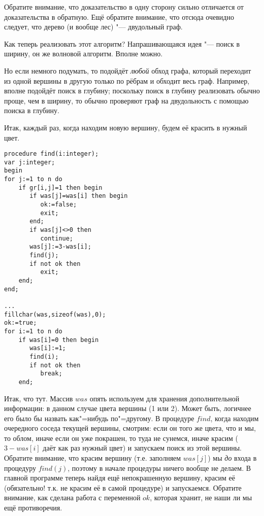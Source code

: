 Обратите внимание, что доказательство в одну сторону сильно отличается от доказательства в 
обратную. Ещё обратите внимание, что отсюда очевидно следует, что дерево (и вообще лес) "--- 
двудольный граф.

\vspace{0.2cm}


Как теперь реализовать этот алгоритм? Напрашивающаяся идея "--- поиск в ширину, он же волновой 
алгоритм. Вполне можно. 


Но если немного подумать, то подойдёт \textit{любой} обход  графа, который переходит из одной 
вершины в другую только по рёбрам и обходит весь граф. Например, вполне подойдёт поиск в глубину; 
поскольку поиск в глубину реализовать обычно проще, чем в ширину, то обычно проверяют граф на 
двудольность с помощью поиска в глубину.

Итак, каждый раз, когда находим новую вершину, будем её красить в нужный цвет.
\begin{codesample}
\begin{verbatim}
procedure find(i:integer);
var j:integer;
begin
for j:=1 to n do
    if gr[i,j]=1 then begin
       if was[j]=was[i] then begin
          ok:=false;
          exit;
       end;
       if was[j]<>0 then
          continue;
       was[j]:=3-was[i];
       find(j);
       if not ok then
          exit;
    end;
end;

...
fillchar(was,sizeof(was),0);
ok:=true;
for i:=1 to n do
    if was[i]=0 then begin
       was[i]:=1;
       find(i);
       if not ok then
          break;
    end;
\end{verbatim}
\end{codesample}

Итак, что тут. Массив $was$ опять используем для хранения дополнительной информации: в данном 
случае цвета вершины (1 или 2). Может быть, логичнее его было бы назвать как"=нибудь по"=другому.
В процедуре $find$, когда находим очередного соседа текущей вершины, смотрим: если он того же 
цвета, что и мы, то облом, иначе если он уже покрашен, то туда не сунемся, иначе красим ($3-was[i]$ 
даёт как раз нужный цвет) и запускаем поиск из этой вершины. Обратите внимание, что красим вершину 
(т.е. заполняем $was[j]$) мы \textit{до} входа в процедуру $find(j)$, поэтому в начале процедуры 
ничего вообще не делаем. В главной программе теперь найдя ещё непокрашенную вершину, красим её 
(обязательно! т.к. не красим её в самой процедуре) и запускаемся. Обратите внимание, как сделана 
работа с переменной $ok$, которая хранит, не наши ли мы ещё противоречия.

